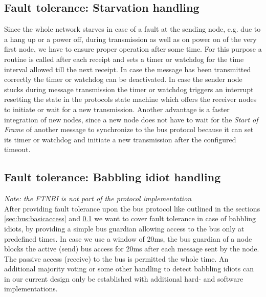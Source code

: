 \subsection{Fault tolerance: Starvation handling}
\label{sec:bus:ftnsh}
Since the whole network starves in case of a fault at the sending node, e.g. due to a hang up or a power off, during transmission as well as on power on of the very first node, we have to ensure proper operation after some time.
For this purpose a routine is called after each receipt and sets a timer or watchdog for the time interval allowed till the next receipt.
In case the message has been transmitted correctly the timer or watchdog can be deactivated.
In case the sender node stucks during message transmission the timer or watchdog triggers an interrupt resetting the state in the protocols state machine which offers the receiver nodes to initiate or wait for a new transmission.
Another advantage is a faster integration of new nodes, since a new node does not have to wait for the \textit{Start of Frame} of another message to synchronize to the bus protocol because it can set its timer or watchdog and initiate a new transmission after the configured timeout.


\subsection {Fault tolerance: Babbling idiot handling}
\label{sec:bus:ftnbi}
\textit{Note: the FTNBI is not part of the protocol implementation}\\

After providing fault tolerance upon the bus protocol like outlined in the sections \ref{sec:bus:basicaccess} and \ref{sec:bus:ftnsh} we want to cover fault tolerance in case of babbling idiots, by providing a simple bus guardian allowing access to the bus only at predefined times.
In case we use a window of 20ms, the bus guardian of a node blocks the active (send) bus access for 20ms after each message sent by the node. The passive access (receive) to the bus is permitted the whole time. An additional majority voting or some other handling to detect babbling idiots can in our current design only be established with additional hard- and software implementations.


